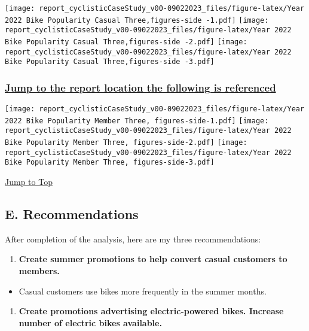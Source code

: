 \documentclass[
]{article}
\providecommand{\tightlist}{%
  \setlength{\itemsep}{0pt}\setlength{\parskip}{0pt}}
\begin{document}
\texttt{[image: report\_cyclisticCaseStudy\_v00-09022023\_files/figure-latex/Year 2022 Bike Popularity Casual Three,figures-side -1.pdf]}
\texttt{[image: report\_cyclisticCaseStudy\_v00-09022023\_files/figure-latex/Year 2022 Bike Popularity Casual Three,figures-side -2.pdf]}
\texttt{[image: report\_cyclisticCaseStudy\_v00-09022023\_files/figure-latex/Year 2022 Bike Popularity Casual Three,figures-side -3.pdf]}

\hypertarget{jump-to-the-report-location-the-following-is-referenced-1}{%
\subsubsection{\texorpdfstring{ \protect\hyperlink{VizRef2}{Jump to the
report location the following is
referenced}}{ Jump to the report location the following is referenced}}\label{jump-to-the-report-location-the-following-is-referenced-1}}

\texttt{[image: report\_cyclisticCaseStudy\_v00-09022023\_files/figure-latex/Year 2022 Bike Popularity Member Three, figures-side-1.pdf]}
\texttt{[image: report\_cyclisticCaseStudy\_v00-09022023\_files/figure-latex/Year 2022 Bike Popularity Member Three, figures-side-2.pdf]}
\texttt{[image: report\_cyclisticCaseStudy\_v00-09022023\_files/figure-latex/Year 2022 Bike Popularity Member Three, figures-side-3.pdf]}

\protect\hyperlink{toc}{Jump to Top}

\hypertarget{e.-recommendations}{%
\subsection{E. Recommendations}\label{e.-recommendations}}

After completion of the analysis, here are my three recommendations:

\begin{enumerate}
\def\labelenumi{\arabic{enumi}.}
\tightlist
\item
  \textbf{Create summer promotions to help convert casual customers to
  members.}
\end{enumerate}

\begin{itemize}
\tightlist
\item
  Casual customers use bikes more frequently in the summer months.
\end{itemize}

\begin{enumerate}
\def\labelenumi{\arabic{enumi}.}
\setcounter{enumi}{1}
\tightlist
\item
  \textbf{Create promotions advertising electric-powered bikes. Increase
  number of electric bikes available.}
\end{enumerate}
\end{document}
